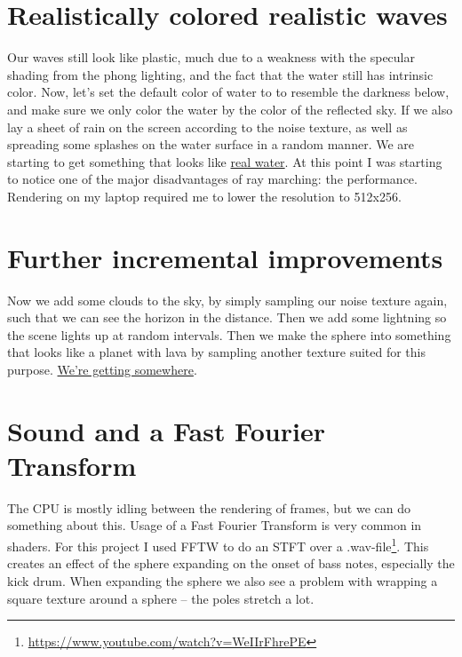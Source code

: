\documentclass[abstract=off,oneside]{scrreprt}
\begin{document}
\section*{Realistically colored realistic waves}
\label{sec-10}
\label{sec:realisticcolor}
Our waves still look like plastic, much due to a weakness with the
specular shading from the phong lighting, and the fact that the water
still has intrinsic color. Now, let's set the default color of water
to to resemble the darkness below, and make sure we only color the
water by the color of the reflected sky. If we also lay a sheet of
rain on the screen according to the noise texture, as well as
spreading some splashes on the water surface in a random manner. We
are starting to get something that looks like \hyperref[fig:okwater]{real water}. At this
point I was starting to notice one of the major disadvantages of ray
marching: the performance. Rendering on my laptop required me to lower
the resolution to 512x256.

\section*{Further incremental improvements}
\label{sec-11}
\label{sec:furtherimprovements}
Now we add some clouds to the sky, by simply sampling our noise
texture again, such that we can see the horizon in the distance. Then
we add some lightning so the scene lights up at random intervals. Then
we make the sphere into something that looks like a planet with lava
by sampling another texture suited for this purpose. \hyperref[fig:improvements]{We're getting
somewhere}.

\section*{Sound and a Fast Fourier Transform}
\label{sec-12}
\label{sec:sound}
The CPU is mostly idling between the rendering of frames, but we can
do something about this. Usage of a Fast Fourier Transform is very
common in shaders. For this project I used FFTW to do an STFT over a
.wav-file\footnote{\url{https://www.youtube.com/watch?v=WeIIrFhrePE}}. This creates an effect of the sphere expanding on the
onset of bass notes, especially the kick drum. When expanding the
sphere we also see a problem with wrapping a square texture around a
sphere -- the poles stretch a lot.
\end{document}
